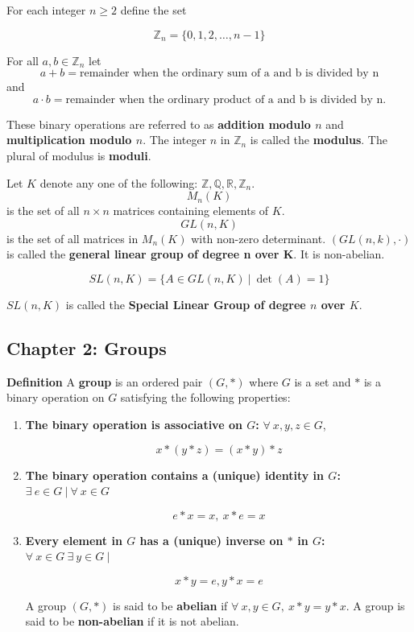 \documentclass{article}
\begin{document}
\pagebreak

For each integer \(n \geq 2\) define the set

\[
\mathbb{Z}_n = \{0, 1, 2, \ldots, n-1\}
\]

For all \(a, b \in \mathbb{Z}_n\) let \[a + b = \text{remainder when the ordinary sum of a and b is divided by n}\] and \[a \cdot b = \text{remainder when the ordinary product of a and b is divided by n.}\]

These binary operations are referred to as \textbf{addition modulo \(n\)} and \textbf{multiplication modulo \(n\)}. The integer \(n\) in \(\mathbb{Z}_n\) is called the \textbf{modulus}. The plural of modulus is \textbf{moduli}.

Let \(K\) denote any one of the following: \(\mathbb{Z}, \mathbb{Q}, \mathbb{R}, \mathbb{Z}_n\). \[M_n(K)\] is the set of all \(n \times n\) matrices containing elements of \(K\). \[GL(n, K)\] is the set of all matrices in \(M_{n}(K)\) with non-zero determinant. \((GL(n, k), \cdot)\) is called the \textbf{general linear group of degree n over K}. It is non-abelian.

\[
SL(n, K) = \{A \in GL(n, K) \ | \ \det(A) = 1\}
\]

\(SL(n, K)\) is called the \textbf{Special Linear Group of degree \(n\) over \(K\)}.

\pagebreak

\subsection{Chapter 2: Groups}

\textbf{Definition} A \textbf{group} is an ordered pair \((G, *)\) where \(G\) is a set and \(*\) is a binary operation on \(G\) satisfying the following properties:

\begin{enumerate}[1.]

\item \textbf{The binary operation is associative on \(G\):} \(\forall \ x, y , z \in G\), 

\[
x * (y * z) = (x * y) * z
\]

\item \textbf{The binary operation contains a (unique) identity in \(G\):} \(\exists \ e \in G \ | \ \forall \ x  \in  G\)

\[
e * x = x, \ x * e = x 
\]

\item \textbf{Every element in \(G\) has a (unique) inverse on \(*\) in \(G\):} \(\forall \ x \in G \ \exists \ y \in G \ |\)

\[
x*y = e, y*x =e
\]

A group \( (G, *)\) is said to be \textbf{abelian} if \(\forall \ x, y \in G, \ x*y = y*x\). A group is said to be \textbf{non-abelian} if it is not abelian.

\end{enumerate}
\end{document}
